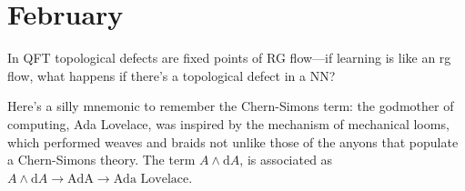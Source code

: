 \documentclass{report}
\begin{document}


\chapter{February}
\begin{tocbox}
	\minitoc
\end{tocbox}

In QFT topological defects are fixed points of RG flow---if learning is like an 
rg flow, what happens if there's a topological defect in a NN?

Here's a silly mnemonic to remember the Chern-Simons term: the godmother of 
computing, Ada Lovelace, was inspired by the mechanism of mechanical looms,
which performed weaves and braids not unlike those of the anyons that populate 
a Chern-Simons theory. The term $ A\wedge \text{d} A $, is associated as 
$ A\wedge \text{d}A \rightarrow \text{AdA} \rightarrow \text{Ada Lovelace} $. 
\end{document}
